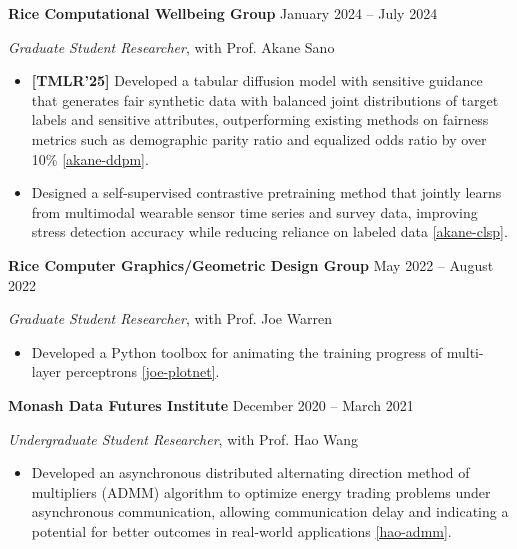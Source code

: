 \documentclass[11pt]{article}
\newcommand{\venue}[1]{[\textsc{#1}]}
\newcommand{\topvenuetag}[1]{{\color{BrickRed}\textbf{[\textsc{#1}]}}}
\begin{document}
\vspace{\lineskip}

\textbf{Rice Computational Wellbeing Group} \hfill January 2024 -- July 2024

\textit{Graduate Student Researcher}, with Prof. Akane Sano

\begin{itemize}
    \item \topvenuetag{TMLR'25} Developed a tabular diffusion model with sensitive guidance that generates fair synthetic data with balanced joint distributions of target labels and sensitive attributes, outperforming existing methods on fairness metrics such as demographic parity ratio and equalized odds ratio by over 10\% \ref{akane-ddpm}.
    \item \venue{CHIL'25} Designed a self-supervised contrastive pretraining method that jointly learns from multimodal wearable sensor time series and survey data, improving stress detection accuracy while reducing reliance on labeled data \ref{akane-clsp}.
\end{itemize}

\vspace{\lineskip}

\textbf{Rice Computer Graphics/Geometric Design Group} \hfill May 2022 -- August 2022

\textit{Graduate Student Researcher}, with Prof. Joe Warren

\begin{itemize}
    \item \venue{GitHub'22} Developed a Python toolbox for animating the training progress of multi-layer perceptrons \ref{joe-plotnet}.
\end{itemize}

\vspace{\lineskip}

\textbf{Monash Data Futures Institute} \hfill December 2020 -- March 2021

\textit{Undergraduate Student Researcher}, with Prof. Hao Wang

\begin{itemize}
    \item \venue{arXiv'23} Developed an asynchronous distributed alternating direction method of multipliers (ADMM) algorithm to optimize energy trading problems under asynchronous communication, allowing communication delay and indicating a potential for better outcomes in real-world applications \ref{hao-admm}.
\end{itemize}
\end{document}
